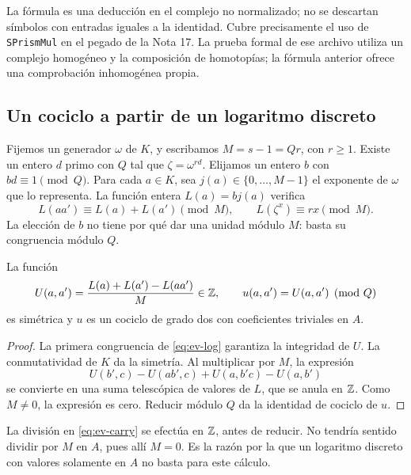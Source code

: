 La fórmula es una deducción en el complejo no normalizado; no se descartan símbolos con entradas iguales a la identidad. Cubre precisamente el uso de \texttt{SPrismMul} en el pegado de la Nota 17. La prueba formal de ese archivo utiliza un complejo homogéneo y la composición de homotopías; la fórmula anterior ofrece una comprobación inhomogénea propia.

\subsection{Un cociclo a partir de un logaritmo discreto}

Fijemos un generador $\omega$ de $K$, y escribamos $M=s-1=Qr$, con $r\ge1$. Existe un entero $d$ primo con $Q$ tal que $\zeta=\omega^{rd}$. Elijamos un entero $b$ con $bd\equiv1\pmod Q$. Para cada $a\in K$, sea $j(a)\in\{0,\ldots,M-1\}$ el exponente de $\omega$ que lo representa. La función entera $L(a)=b j(a)$ verifica
\begin{equation}
 L(aa')\equiv L(a)+L(a')\pmod M,\qquad
 L(\zeta^x)\equiv rx\pmod M.
 \label{eq:ev-log}
\end{equation}
La elección de $b$ no tiene por qué dar una unidad módulo $M$: basta su congruencia módulo $Q$.

\begin{lema}
\label{lem:ev-carry}
La función
\begin{equation}
 U(a,a')=\frac{L(a)+L(a')-L(aa')}{M}\in\mathbb{Z},
 \qquad u(a,a')=U(a,a')\pmod Q
 \label{eq:ev-carry}
\end{equation}
es simétrica y $u$ es un cociclo de grado dos con coeficientes triviales en $A$.
\end{lema}
\begin{proof}
La primera congruencia de \eqref{eq:ev-log} garantiza la integridad de $U$. La conmutatividad de $K$ da la simetría. Al multiplicar por $M$, la expresión
\[
 U(b',c)-U(ab',c)+U(a,b'c)-U(a,b')
\]
se convierte en una suma telescópica de valores de $L$, que se anula en $\mathbb{Z}$. Como $M\ne0$, la expresión es cero. Reducir módulo $Q$ da la identidad de cociclo de $u$.
\end{proof}

La división en \eqref{eq:ev-carry} se efectúa en $\mathbb{Z}$, antes de reducir. No tendría sentido dividir por $M$ en $A$, pues allí $M=0$. Es la razón por la que un logaritmo discreto con valores solamente en $A$ no basta para este cálculo.


